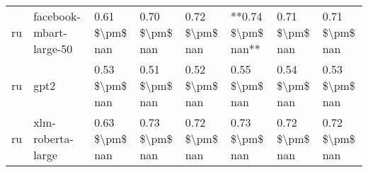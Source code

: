 \begin{tabular}{llllllll}
      ru &            facebook-mbart-large-50 & 0.61 \$\textbackslash pm\$ nan &            0.70 \$\textbackslash pm\$ nan &        0.72 \$\textbackslash pm\$ nan &     **0.74 \$\textbackslash pm\$ nan** &                          0.71 \$\textbackslash pm\$ nan &     0.71 \$\textbackslash pm\$ nan \\
      ru &                               gpt2 & 0.53 \$\textbackslash pm\$ nan &            0.51 \$\textbackslash pm\$ nan &        0.52 \$\textbackslash pm\$ nan &         0.55 \$\textbackslash pm\$ nan &                          0.54 \$\textbackslash pm\$ nan &     0.53 \$\textbackslash pm\$ nan \\
      ru &                  xlm-roberta-large & 0.63 \$\textbackslash pm\$ nan &            0.73 \$\textbackslash pm\$ nan &        0.72 \$\textbackslash pm\$ nan &         0.73 \$\textbackslash pm\$ nan &                          0.72 \$\textbackslash pm\$ nan &     0.72 \$\textbackslash pm\$ nan \\
\bottomrule
\end{tabular}
